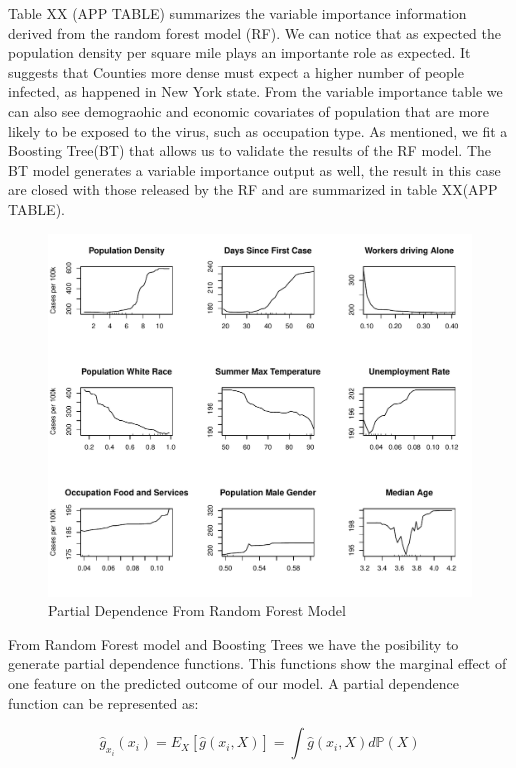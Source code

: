 \documentclass[
]{article}
\begin{document}
Table XX (APP TABLE) summarizes the variable importance information
derived from the random forest model (RF). We can notice that as
expected the population density per square mile plays an importante role
as expected. It suggests that Counties more dense must expect a higher
number of people infected, as happened in New York state. From the
variable importance table we can also see demograohic and economic
covariates of population that are more likely to be exposed to the
virus, such as occupation type. As mentioned, we fit a Boosting Tree(BT)
that allows us to validate the results of the RF model. The BT model
generates a variable importance output as well, the result in this case
are closed with those released by the RF and are summarized in table
XX(APP TABLE).

\begin{figure}
\centering
\includegraphics{Final-Project-Covid-19_files/figure-latex/fig1-1.pdf}
\caption{Partial Dependence From Random Forest Model}
\end{figure}

From Random Forest model and Boosting Trees we have the posibility to
generate partial dependence functions. This functions show the marginal
effect of one feature on the predicted outcome of our model. A partial
dependence function can be represented as:

\[\hat{g}_{x_i}(x_i)=E_{X}\left[\hat{g}(x_i,X)\right]=\int\hat{g}(x_i,X)d\mathbb{P}(X)\]
\end{document}
